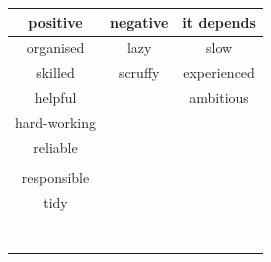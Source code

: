 \documentclass[spanish,openany]{report}
\date{\today}
\begin{document}

%
%
%


\begin{tabularx}{\linewidth}{|C|C|C|}
	positive & negative & it depends \\
	\hline
	organised & lazy &  slow\\
	\hline
	skilled & scruffy & experienced\\
	\hline
	helpful & & ambitious\\
	\hline
	hard-working & &\\
	\hline
	reliable & &\\
	\hline
	 & &\\
	\hline
	responsible & &\\
	\hline
	tidy & &\\
	\hline
	 & &\\
	\hline
	 & &\\
	\hline
	 & &\\
	\hline
	 & &\\
	\hline
	 & &\\
	\hline
	 & &\\
	\hline
	 & &\\
\end{tabularx}
\end{document}
